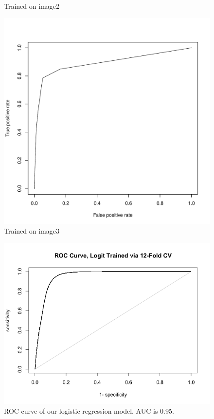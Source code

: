 \documentclass{article}\usepackage[]{graphicx}\usepackage[]{color}
\begin{document}
\begin{figure}[h]
  \caption{Trained on image2}\label{}
\endminipage\hfill
{}%
  \includegraphics[width=\linewidth]{ROC_image8.pdf}
  \caption{Trained on image3}\label{}
\endminipage
\end{figure}

\begin{figure}
\includegraphics[scale = .7]{LogitROC.png}
\caption{ROC curve of our logistic regression model. AUC is 0.95.}
\end{figure}
\end{document}
